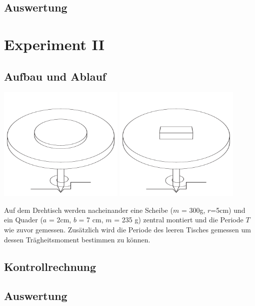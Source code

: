 \documentclass[12pt,a4paper]{article}
\begin{document}
\subsection*{Auswertung}

\newpage
\section*{Experiment II}
\subsection*{Aufbau und Ablauf}
\begin{center}
\includegraphics[width=6cm]{illustration21.pdf}
\includegraphics[width=6cm]{illustration22.pdf}
\end{center}
Auf dem Drehtisch werden nacheinander eine Scheibe ($m$ = 300g, $r$=5cm) und ein Quader ($a$ = 2cm, $b$ = 7 cm, $m$ = 235 g) zentral montiert und die Periode $T$ wie zuvor gemessen. Zusätzlich wird die Periode des leeren Tisches gemessen um dessen Tr\"agheitsmoment bestimmen zu k\"onnen.

\subsection*{Kontrollrechnung}

\subsection*{Auswertung}
\end{document}
